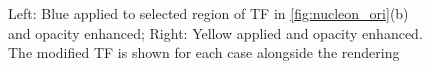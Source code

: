 \documentclass[twoside,twocolumn,10pt]{article}
\begin{document}
\begin{figure}
\begin{minipage}{.13\textwidth}
		\label{fig:tf_nucleon_2_yellow}
	\end{minipage}
	\caption{Left: Blue applied to selected region of TF in \autoref{fig:nucleon_ori}(b) and opacity enhanced; Right: Yellow applied and opacity enhanced. The modified TF is shown for each case alongside the rendering}
	\label{fig:Nucleon_2}
\end{figure}


\end{document}
